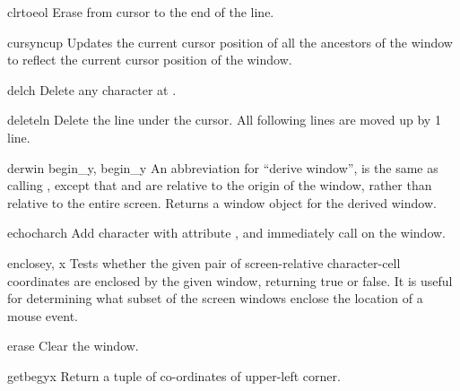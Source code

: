 \begin{methoddesc}{clrtoeol}{}
Erase from cursor to the end of the line.
\end{methoddesc}

\begin{methoddesc}{cursyncup}{}
Updates the current cursor position of all the ancestors of the window
to reflect the current cursor position of the window.
\end{methoddesc}

\begin{methoddesc}{delch}{}
Delete any character at .
\end{methoddesc}

\begin{methoddesc}{deleteln}{}
Delete the line under the cursor. All following lines are moved up
by 1 line.
\end{methoddesc}

\begin{methoddesc}{derwin}{ begin_y, begin_y}
An abbreviation for ``derive window'',  is the same
as calling , except that  and
 are relative to the origin of the window, rather than
relative to the entire screen.  Returns a window object for the
derived window.
\end{methoddesc}

\begin{methoddesc}{echochar}{ch}
Add character  with attribute , and immediately 
call  on the window.
\end{methoddesc}

\begin{methoddesc}{enclose}{y, x}
Tests whether the given pair of screen-relative character-cell
coordinates are enclosed by the given window, returning true or
false.  It is useful for determining what subset of the screen
windows enclose the location of a mouse event.
\end{methoddesc}

\begin{methoddesc}{erase}{}
Clear the window.
\end{methoddesc}

\begin{methoddesc}{getbegyx}{}
Return a tuple  of co-ordinates of upper-left
corner.
\end{methoddesc}

